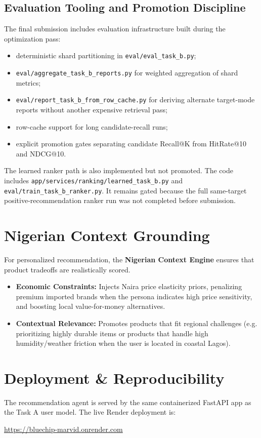 \documentclass[11pt,a4paper]{article}
\begin{document}
\subsection{Evaluation Tooling and Promotion Discipline}
The final submission includes evaluation infrastructure built during the optimization pass:
\begin{itemize}
    \item deterministic shard partitioning in \texttt{eval/eval\_task\_b.py};
    \item \texttt{eval/aggregate\_task\_b\_reports.py} for weighted aggregation of shard metrics;
    \item \texttt{eval/report\_task\_b\_from\_row\_cache.py} for deriving alternate target-mode reports without another expensive retrieval pass;
    \item row-cache support for long candidate-recall runs;
    \item explicit promotion gates separating candidate Recall@K from HitRate@10 and NDCG@10.
\end{itemize}

The learned ranker path is also implemented but not promoted. The code includes \texttt{app/services/ranking/learned\_task\_b.py} and \texttt{eval/train\_task\_b\_ranker.py}. It remains gated because the full same-target positive-recommendation ranker run was not completed before submission.

\section{Nigerian Context Grounding}
For personalized recommendation, the \textbf{Nigerian Context Engine} ensures that product tradeoffs are realistically scored. 
\begin{itemize}
    \item \textbf{Economic Constraints:} Injects Naira price elasticity priors, penalizing premium imported brands when the persona indicates high price sensitivity, and boosting local value-for-money alternatives.
    \item \textbf{Contextual Relevance:} Promotes products that fit regional challenges (e.g. prioritizing highly durable items or products that handle high humidity/weather friction when the user is located in coastal Lagos).
\end{itemize}

\section{Deployment \& Reproducibility}
The recommendation agent is served by the same containerized FastAPI app as the Task A user model. The live Render deployment is:
\begin{center}
\href{https://bluechip-marvid.onrender.com}{https://bluechip-marvid.onrender.com}
\end{center}
\end{document}
